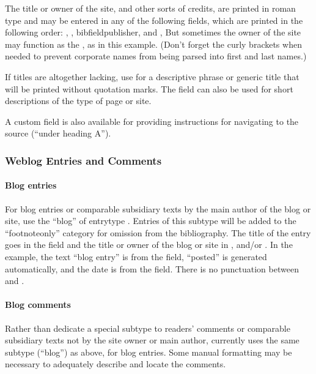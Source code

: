 \documentclass{ltxdockit}[2010/02/12]
\begin{document}
The title or owner of the site, and other sorts of credits, are printed in roman type and may be entered in any of the following fields, which are printed in the following order: , , bibfield{publisher}, and ,\autocites[][]{koeniker-society-for-the}
But sometimes the owner of the site may function as the , as in this example.\autocites[][]{osu-pauling} (Don't forget the curly brackets when needed to prevent corporate names from being parsed into first and last names.)

If titles are altogether lacking, use  for a descriptive phrase or generic title that will be printed without quotation marks. The  field can also be used for short descriptions of the type of page or site.

A  custom field is also available for providing instructions for navigating to the source (\eg ``under heading A'').

\subsubsection{Weblog Entries and Comments}
\paragraph{Blog entries}
For blog entries or comparable subsidiary texts by the main author of the blog or site, use  the  ``blog'' of entrytype . Entries of this subtype will be added to the ``footnoteonly'' category for omission from the bibliography.\autocites[][]{myers2007trolling-faith} The title of the entry goes in the  field and the title or owner of the blog or site in ,  and/or . In the example, the text ``blog entry'' is from the  field, ``posted'' is generated automatically, and the date is from the  field. There is no punctuation between  and .

\paragraph{Blog comments}
Rather than dedicate a special subtype to readers' comments or comparable subsidiary texts not by the site owner or main author,  currently uses the same subtype (``blog'') as above, for blog entries. Some manual formatting may be necessary to adequately describe and locate the comments.
\end{document}
